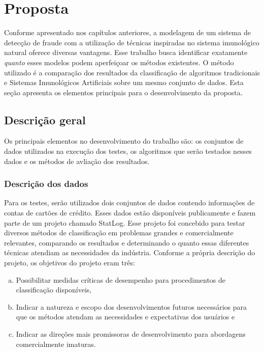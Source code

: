 \chapter{Proposta}

Conforme apresentado nos capítulos anteriores, a modelagem de um sistema de detecção de fraude com a utilização de técnicas inspiradas no sistema imunológico natural oferece diversas vantagens. Esse trabalho busca identificar exatamente \emph{quanto} esses modelos podem aperfeiçoar os métodos existentes. O método utilizado é a comparação dos resultados da classificação de algoritmos tradicionais e Sistemas Imunológicos Artificiais sobre um mesmo conjunto de dados. Esta seção apresenta os elementos principais para o desenvolvimento da proposta.

\section{Descrição geral}

Os principais elementos no desenvolvimento do trabalho são: os conjuntos de dados utilizados na execução dos testes, os algoritmos que serão testados nesses dados e os métodos de avliação dos resultados.

\subsection{Descrição dos dados}

Para os testes, serão utilizados dois conjuntos de dados contendo informações de contas de cartões de crédito. Esses dados estão disponíveis publicamente e fazem parte de um projeto chamado StatLog. Esse projeto foi concebido para testar diversos métodos de classificação em problemas grandes e comercialmente relevantes, comparando os resultados e determinando o quanto essas diferentes técnicas atendiam as necessidades da indústria. Conforme a própria descrição do projeto, os objetivos do projeto eram três:

\begin{enumerate}[a)]
    \item Possibilitar medidas críticas de desempenho para procedimentos de classificação disponíveis,
    \item Indicar a natureza e escopo dos desenvolvimentos futuros necessários para que os métodos atendam as necessidades e expectativas dos usuários e
    \item Indicar as direções mais promissoras de desenvolvimento para abordagens comercialmente imaturas.
\end{enumerate}

